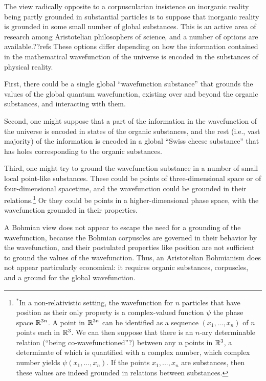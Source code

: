 The view radically opposite to a corpuscularian insistence on inorganic reality being partly grounded in substantial 
particles is to suppose that inorganic reality is grounded in some small number of global substances. This is an 
active area of research among Aristotelian philosophers of science, and a number of options are available.??refs 
These options differ depending on how the information contained in the mathematical wavefunction of the universe
is encoded in the substances of physical reality.

First, there 
could be a single global ``wavefunction substance'' that grounds the values of the global quantum wavefunction, existing
over and beyond the organic substances, and interacting with them.

Second, one might suppose that a part of the information in the 
wavefunction of the universe is encoded in states of the organic substances, and the rest (i.e., vast majority) of 
the information is encoded in a global ``Swiss cheese substance'' that has holes corresponding to the organic substances. 


Third, one might try to ground the wavefunction substance in a number of small local point-like substances.
These could be points of three-dimensional space or of four-dimensional spacetime, and the wavefunction could be 
grounded in their relations.\footnote{$^*$In a non-relativistic setting, the wavefunction for $n$ particles that 
have position as their only property is a complex-valued function $\psi$ the phase space $\mathbb R^{3n}$. A point in $\mathbb R^{3n}$ can 
be identified as a sequence $(x_1,...,x_n)$ of $n$ points each in $\mathbb R^3$. We can then suppose that there is an 
$n$-ary determinable relation (``being co-wavefunctioned''?) between any $n$ points in $\mathbb R^3$, a determinate of which is 
quantified with a complex number, which complex number yields $\psi(x_1,...,x_n)$. If the points $x_1,...,x_n$ are 
substances, then these values are indeed grounded in relations between substances.} Or they could be points in a higher-dimensional
phase space, with the wavefunction grounded in their properties. 

A Bohmian view does not appear to escape the need for a grounding of the wavefunction, because the Bohmian corpuscles are 
governed in their behavior by the wavefunction, and their postulated properties like position are not sufficient to ground the values of the wavefunction. Thus, an Aristotelian Bohmianism does not appear particularly economical: it requires organic
substances, corpuscles, and a ground for the global wavefunction.

